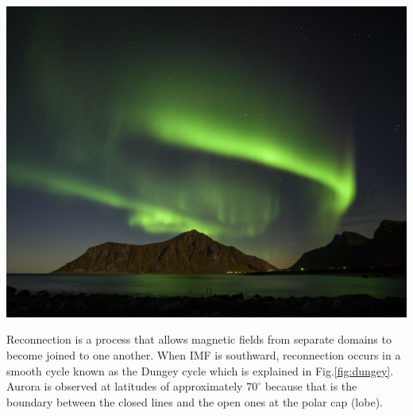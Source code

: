 \documentclass[12pt]{article}
\newenvironment{Figure}
  {\par\medskip\noindent\minipage{\linewidth}}
  {\endminipage\par\medskip}
\begin{document}
\begin{Figure}
    \begin{minipage}[c]{0.67\textwidth}
        \centering
        \includegraphics[width=0.8\linewidth]{nothernLights.jpg}
    \end{minipage}
    \begin{minipage}[c]{0.3\textwidth}
        \label{fig:auroraPic}
    \end{minipage}
\end{Figure}

Reconnection is a process that allows magnetic fields from separate domains to become joined to one another. When IMF is southward, reconnection occurs in a smooth cycle known as the Dungey cycle \cite{dungeyCycle} which is explained in Fig.\ref{fig:dungey}. Aurora is observed at latitudes of approximately $70^{\circ}$ because that is the boundary between the closed lines and the open ones at the polar cap (lobe).
\end{document}
